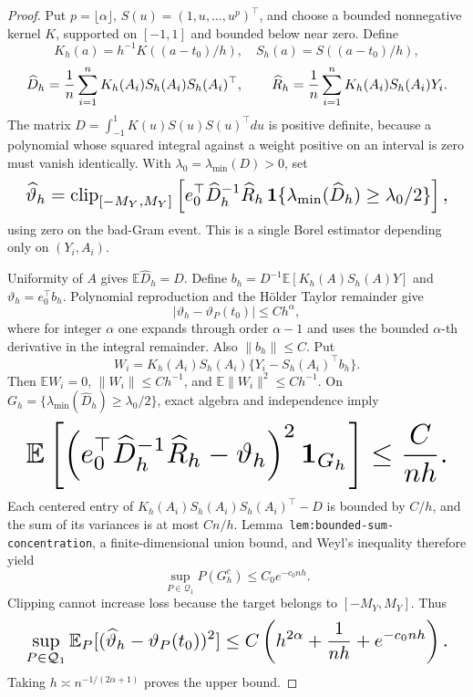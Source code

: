 \documentclass{article}
\begin{document}
\begin{proof}
Put \(p=\lfloor\alpha\rfloor\), \(S(u)=(1,u,\ldots,u^p)^\top\), and choose a bounded nonnegative kernel \(K\), supported on \([-1,1]\) and bounded below near zero. Define
\[
K_h(a)=h^{-1}K((a-t_0)/h),\quad S_h(a)=S((a-t_0)/h),
\]
\[
\makebox[\linewidth][c]{\resizebox{0.98\linewidth}{!}{\par\noindent \makebox[\linewidth][c]{\resizebox{0.98\linewidth}{!}{\(\displaystyle \displaystyle \widehat D_h=\frac1n\sum_{i=1}^nK_h(A_i)S_h(A_i)S_h(A_i)^\top,\qquad \widehat R_h=\frac1n\sum_{i=1}^nK_h(A_i)S_h(A_i)Y_i.\)}}\par\noindent}}
\]
The matrix \(D=\int_{-1}^1K(u)S(u)S(u)^\top du\) is positive definite, because a polynomial whose squared integral against a weight positive on an interval is zero must vanish identically. With \(\lambda_0=\lambda_{\min}(D)>0\), set
\[
\makebox[\linewidth][c]{\resizebox{0.98\linewidth}{!}{\par\noindent \makebox[\linewidth][c]{\resizebox{0.98\linewidth}{!}{\(\displaystyle \displaystyle \widehat\vartheta_h=\operatorname{clip}_{[-M_Y,M_Y]}\left[e_0^\top\widehat D_h^{-1}\widehat R_h\,\mathbf1\{\lambda_{\min}(\widehat D_h)\ge\lambda_0/2\}\right],\)}}\par\noindent}}
\]
using zero on the bad-Gram event. This is a single Borel estimator depending only on \((Y_i,A_i)\).

Uniformity of \(A\) gives \(\mathbb E\widehat D_h=D\). Define \(b_h=D^{-1}\mathbb E[K_h(A)S_h(A)Y]\) and \(\vartheta_h=e_0^\top b_h\). Polynomial reproduction and the H\"older Taylor remainder give
\[
\lvert\vartheta_h-\vartheta_P(t_0)\rvert\le Ch^\alpha,
\]
where for integer \(\alpha\) one expands through order \(\alpha-1\) and uses the bounded \(\alpha\)-th derivative in the integral remainder. Also \(\lVert b_h\rVert\le C\). Put
\[
W_i=K_h(A_i)S_h(A_i)\{Y_i-S_h(A_i)^\top b_h\}.
\]
Then \(\mathbb EW_i=0\), \(\lVert W_i\rVert\le Ch^{-1}\), and \(\mathbb E\lVert W_i\rVert^2\le Ch^{-1}\). On \(G_h=\{\lambda_{\min}(\widehat D_h)\ge\lambda_0/2\}\), exact algebra and independence imply
\[
\makebox[\linewidth][c]{\resizebox{0.98\linewidth}{!}{\par\noindent \makebox[\linewidth][c]{\resizebox{0.98\linewidth}{!}{\(\displaystyle \displaystyle \mathbb E\left[\left(e_0^\top\widehat D_h^{-1}\widehat R_h-\vartheta_h\right)^2\mathbf1_{G_h}\right]\le\frac{C}{nh}.\)}}\par\noindent}}
\]
Each centered entry of \(K_h(A_i)S_h(A_i)S_h(A_i)^\top-D\) is bounded by \(C/h\), and the sum of its variances is at most \(Cn/h\). Lemma~\texttt{lem:bounded-sum-concentration}, a finite-dimensional union bound, and Weyl's inequality therefore yield
\[
\sup_{P\in\mathcal Q_1}P(G_h^c)\le C_0e^{-c_0nh}.
\]
Clipping cannot increase loss because the target belongs to \([-M_Y,M_Y]\). Thus
\[
\makebox[\linewidth][c]{\resizebox{0.98\linewidth}{!}{\par\noindent \makebox[\linewidth][c]{\resizebox{0.98\linewidth}{!}{\(\displaystyle \displaystyle \sup_{P\in\mathcal Q_1}\mathbb E_P[(\widehat\vartheta_h-\vartheta_P(t_0))^2]\le C\left(h^{2\alpha}+\frac1{nh}+e^{-c_0nh}\right).\)}}\par\noindent}}
\]
Taking \(h\asymp n^{-1/(2\alpha+1)}\) proves the upper bound.


\end{proof}
\end{document}
